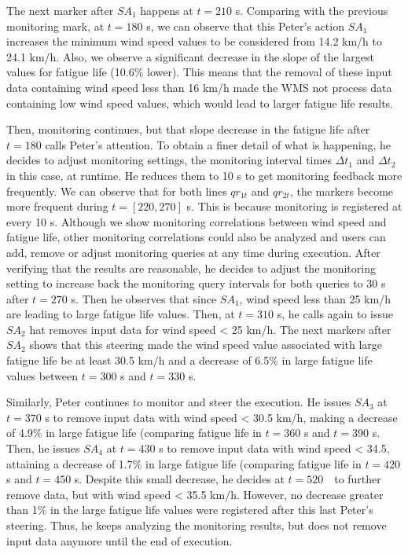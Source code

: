 The next marker after $SA_1$ happens at $t=210$ s. Comparing
with the previous monitoring mark, at $t=180$ s, we can observe
that this Peter's action $SA_1$ increases the minimum wind speed
values to be considered from 14.2 km/h to 24.1 km/h. Also, we observe a
significant decrease in the slope of the largest values for fatigue life
(10.6\% lower). This means that the removal of these input data
containing wind speed less than 16 km/h made the WMS not process data
containing low wind speed values, which would lead to larger fatigue
life results.

Then, monitoring continues, but that slope decrease in the fatigue life after $t=180$ calls Peter's
attention. To obtain a finer detail of what is happening, he decides to
adjust monitoring settings, the monitoring interval times
$\Delta t_1$ and $\Delta t_2$ in this case, at runtime. He reduces them to
10 s to get monitoring feedback more frequently. We can observe that
for both lines $qr_{1t}$ and $qr_{2t}$, the markers
become more frequent during $t = [220,270]$ s.
 This
is because monitoring is registered at every 10 s. Although we show
monitoring correlations between wind speed and fatigue life, other
monitoring correlations could also be analyzed and users can add, remove
or adjust monitoring queries at any time during execution. After
verifying that the results are reasonable, he decides to adjust the
monitoring setting to increase back the monitoring query intervals for
both queries to 30 s after $t=270$ s. Then he observes that since
$SA_1$, wind speed less than 25 km/h are leading to large fatigue
life values. Then, at $t=310$ s, he calls  again to issue
$SA_2$  hat removes input data for wind speed \textless{} 25 km/h.
The next markers after $SA_2$ shows that this steering made the wind
speed value associated with large fatigue life be at least 30.5 km/h and a
decrease of 6.5\% in large fatigue life values between $t=300$ s
and $t=330$ s.

Similarly, Peter continues to monitor and steer the execution.
He issues $SA_3$ at $t=370$ s to remove input data with wind speed
\textless{} 30.5 km/h, making a decrease of 4.9\% in large fatigue life
(comparing fatigue life in $t=360$ s and $t=390$ s.
 Then,
he issues $SA_4$ at $t=430$ s to remove input data with wind
speed \textless{} 34.5, attaining a decrease of 1.7\% in large fatigue
life (comparing fatigue life in $t=420$ s and $t=450$ s.
Despite this small decrease, he decides at $t = 520 \text{ }$ to further remove
data, but with wind speed \textless{} 35.5 km/h. However, no decrease
greater than 1\% in the large fatigue life values were registered after
this last Peter's steering. Thus, he keeps analyzing the monitoring
results, but does not remove input data anymore until the end of
execution.


